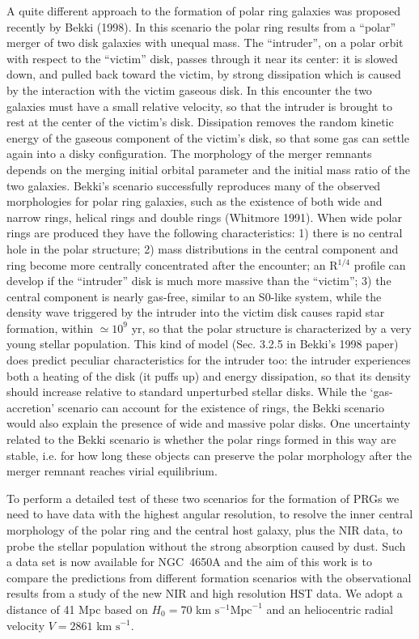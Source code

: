 \documentclass[preprint]{aastex}
\begin{document}
A quite different approach to the formation of polar ring galaxies was
proposed recently by Bekki (1998). In this scenario the polar ring
results from a ``polar'' merger of two disk galaxies with 
unequal mass.  
The ``intruder'', on a polar orbit with respect to the ``victim'' disk, 
passes through it near its center: it is slowed down, and pulled back 
toward the victim, by strong dissipation which is caused by the interaction 
with the victim gaseous disk.  
In this encounter the two galaxies must have a small relative
velocity, so that the intruder is brought to rest at the center of the
victim's disk.  
Dissipation removes the random kinetic energy of the
gaseous component of the victim's disk, so that some gas
can settle again into a disky configuration.
The morphology of the merger remnants depends on the merging
initial orbital parameter and the initial mass ratio of
the two galaxies. 
Bekki's scenario successfully reproduces many of the observed morphologies 
for polar ring galaxies, such as the existence of both 
wide and narrow rings, helical rings and double rings (Whitmore 1991).
When wide polar rings are produced they have the following characteristics: 
1) there is no central hole in the  polar structure;
2) mass distributions in the central component and ring
become more centrally concentrated after the encounter;
an R$^{1/4}$ profile can develop if the ``intruder'' disk is much more
massive than the ``victim'';
3) the central component is nearly gas-free, similar to an S$0$-like system,
while the density wave triggered by the intruder into the victim
disk causes rapid star formation, within $\simeq 10^9$ yr,
so that the polar structure is characterized by a very young stellar 
population.
This kind of model (Sec. 3.2.5 in Bekki's 1998 paper) does 
predict peculiar characteristics for the intruder too: 
the intruder experiences both a heating of the disk (it puffs up) and 
energy dissipation, 
so that its density should increase relative to standard unperturbed
stellar disks. 
While the `gas-accretion' scenario can account for the existence of
rings, the Bekki scenario would also explain the presence of wide and 
massive polar disks.  
One uncertainty related to the Bekki scenario is whether the
polar rings formed in this way are stable, i.e. for how long these
objects can preserve the polar morphology after the merger
remnant reaches virial equilibrium. 

To perform a detailed test of these two scenarios for the formation of
PRGs we need to have data with the highest angular resolution,
to resolve the inner central morphology of the polar ring 
and the central host galaxy, plus the NIR data, to probe the stellar population 
without the strong absorption caused by dust.
Such a data set is now available for NGC~4650A and the aim of this work is to
compare the predictions from different formation scenarios with
the observational results from a study of the new NIR and
high resolution HST data.
We adopt a distance of 41 Mpc based on 
$H_{0}= 70$ km $\mbox{s}^{-1} \mbox{Mpc}^{-1}$ and an heliocentric radial 
velocity $V = 2861$ km $\mbox{s}^{-1}$.  
 
\end{document}
